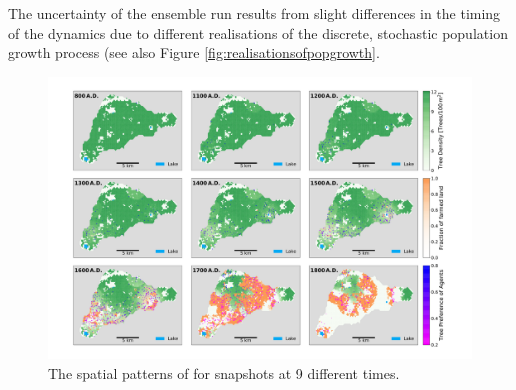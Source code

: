 
The uncertainty of the ensemble run results from slight differences in the timing of the dynamics due to different realisations of the discrete, stochastic population growth process (see also Figure \ref{fig:realisationsofpopgrowth}.



\begin{figure}
	\centering
	\includegraphics[width=1.0\linewidth]{images/Results/Standard/Rull2020_Comparison_seed3}
	\caption{The spatial patterns of for snapshots at 9 different times.  }
	\label{fig:STDrull}
\end{figure}


